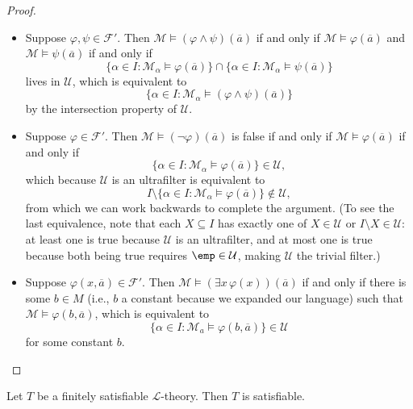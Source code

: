 \documentclass[../notes.tex]{subfiles}
\begin{document}
\begin{proof}
	\begin{itemize}
		\item Suppose $\varphi,\psi\in\mathcal F'$. Then $\mathcal M\models(\varphi\land\psi)(\overline a)$ if and only if $\mathcal M\models\varphi(\overline a)$ and $\mathcal M\models\psi(\overline a)$ if and only if
		\[\{\alpha\in I:\mathcal M_\alpha\models\varphi(\overline a)\}\cap\{\alpha\in I:\mathcal M_\alpha\models\psi(\overline a)\}\]
		lives in $\mathcal U$, which is equivalent to
		\[\{\alpha\in I:\mathcal M_\alpha\models(\varphi\land\psi)(\overline a)\}\]
		by the intersection property of $\mathcal U$.
		\item Suppose $\varphi\in\mathcal F'$. Then $\mathcal M\models(\lnot\varphi)(\overline a)$ is false if and only if $\mathcal M\models\varphi(\overline a)$ if and only if
		\[\{\alpha\in I:\mathcal M_\alpha\models\varphi(\overline a)\}\in\mathcal U,\]
		which because $\mathcal U$ is an ultrafilter is equivalent to
		\[I\setminus\{\alpha\in I:\mathcal M_\alpha\models\varphi(\overline a)\}\notin\mathcal U,\]
		from which we can work backwards to complete the argument. (To see the last equivalence, note that each $X\subseteq I$ has exactly one of $X\in\mathcal U$ or $I\setminus X\in\mathcal U$: at least one is true because $\mathcal U$ is an ultrafilter, and at most one is true because both being true requires $\emp\in\mathcal U$, making $\mathcal U$ the trivial filter.)
		\item Suppose $\varphi(x,\overline a)\in\mathcal F'$. Then $\mathcal M\models(\exists x\,\varphi(x))(\overline a)$ if and only if there is some $b\in M$ (i.e., $b$ a constant because we expanded our language) such that $\mathcal M\models\varphi(b,\overline a)$, which is equivalent to
		\[\{\alpha\in I:\mathcal M_a\models\varphi(b,\overline a)\}\in\mathcal U\]
		for some constant $b$.
		\qedhere
	\end{itemize}
\end{proof}
\begin{corollary}
	Let $T$ be a finitely satisfiable $\mathcal L$-theory. Then $T$ is satisfiable.
\end{corollary}
\end{document}
